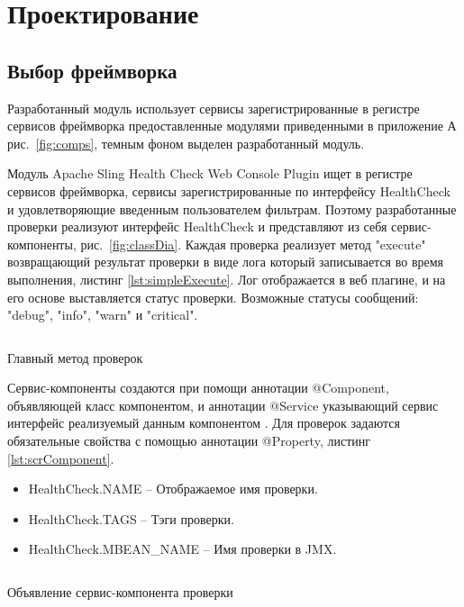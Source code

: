 \chapter{Проектирование}
\label{cha:design}


\section{Выбор фреймворка}

Разработанный модуль использует сервисы зарегистрированные в регистре сервисов фреймворка предоставленные модулями приведенными в приложение А рис.~\ref{fig:comps}, темным фоном выделен разработанный модуль.

Модуль Apache Sling Health Check Web Console Plugin ищет в регистре сервисов фреймворка, сервисы зарегистрированные по интерфейсу HealthCheck и удовлетворяющие введенным пользователем фильтрам. Поэтому разработанные проверки реализуют интерфейс HealthCheck и представляют из себя сервис-компоненты, рис.~\ref{fig:classDia}. Каждая проверка реализует метод "execute" возвращающий результат проверки в виде лога который записывается во время выполнения, листинг \ref{lst:simpleExecute}. Лог отображается в веб плагине, и на его основе выставляется статус проверки. Возможные статусы сообщений: "debug", "info", "warn" и "critical".

\begin{listing}[H]
\inputminted[linenos,frame=single]{java}{inc/src/simpleExecute}
\caption{Главный метод проверок} 
\label{lst:simpleExecute}
\end{listing}

Сервис-компоненты создаются при помощи аннотации @Component, объявляющей класс компонентом, и аннотации @Service указывающий сервис интерфейс реализуемый данным компонентом \cite{web:felixScr}. Для проверок задаются обязательные свойства с помощью аннотации @Property, листинг \ref{lst:scrComponent}.
\begin{itemize}
\item HealthCheck.NAME – Отображаемое имя проверки.
\item HealthCheck.TAGS – Тэги проверки.
\item HealthCheck.MBEAN\_NAME – Имя проверки в JMX.
\end{itemize}

\begin{listing}[H]
\inputminted[linenos,frame=single]{java}{inc/src/scrComponent}
\caption{Объявление сервис-компонента проверки} 
\label{lst:scrComponent}
\end{listing}

